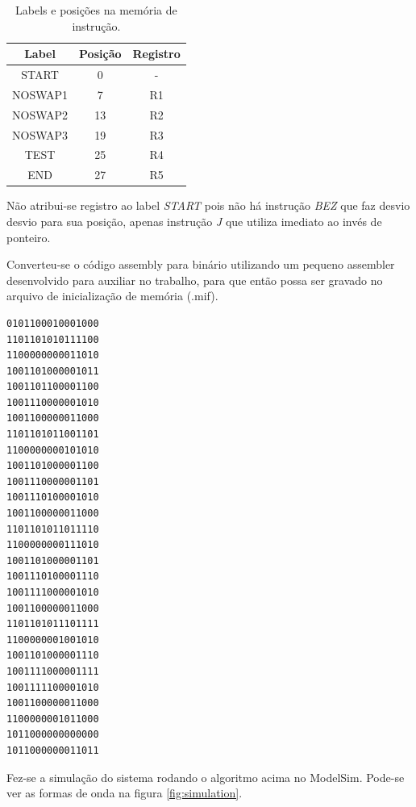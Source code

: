 \documentclass[11pt,a4paper,titlepage]{article}
\begin{document}
\begin{table}[!h]
\centering
\begin{tabular}{| c | c | c |}
\hline
Label & Posição & Registro\\
\hline
START & 0 & -\\
\hline
NOSWAP1 & 7 & R1\\
\hline
NOSWAP2 & 13 & R2\\
\hline
NOSWAP3 & 19 & R3\\
\hline
TEST & 25 & R4\\
\hline
END & 27 & R5\\
\hline
\end{tabular}
\caption{Labels e posições na memória de instrução.}
\label{tab:labels}
\end{table}
%

Não atribui-se registro ao label \textit{START} pois não há instrução \textit{BEZ} que faz desvio desvio para sua posição, apenas instrução \textit{J} que utiliza imediato ao invés de ponteiro.

Converteu-se o código assembly para binário utilizando um pequeno assembler desenvolvido para auxiliar no trabalho, para que então possa ser gravado no arquivo de inicialização de memória (.mif).

\begin{lstlisting}
0101100010001000
1101101010111100
1100000000011010
1001101000001011
1001101100001100
1001110000001010
1001100000011000
1101101011001101
1100000000101010
1001101000001100
1001110000001101
1001110100001010
1001100000011000
1101101011011110
1100000000111010
1001101000001101
1001110100001110
1001111000001010
1001100000011000
1101101011101111
1100000001001010
1001101000001110
1001111000001111
1001111100001010
1001100000011000
1100000001011000
1011000000000000
1011000000011011
\end{lstlisting}

Fez-se a simulação do sistema rodando o algoritmo acima no ModelSim. Pode-se ver as formas de onda na figura \ref{fig:simulation}.
\end{document}
